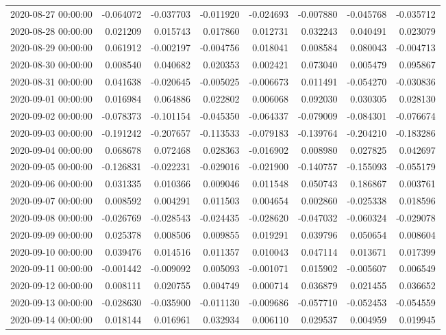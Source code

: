 \begin{tabular}{lrrrrrrr}
2020-08-27 00:00:00 & -0.064072 & -0.037703 & -0.011920 & -0.024693 & -0.007880 & -0.045768 & -0.035712 \\
2020-08-28 00:00:00 & 0.021209 & 0.015743 & 0.017860 & 0.012731 & 0.032243 & 0.040491 & 0.023079 \\
2020-08-29 00:00:00 & 0.061912 & -0.002197 & -0.004756 & 0.018041 & 0.008584 & 0.080043 & -0.004713 \\
2020-08-30 00:00:00 & 0.008540 & 0.040682 & 0.020353 & 0.002421 & 0.073040 & 0.005479 & 0.095867 \\
2020-08-31 00:00:00 & 0.041638 & -0.020645 & -0.005025 & -0.006673 & 0.011491 & -0.054270 & -0.030836 \\
2020-09-01 00:00:00 & 0.016984 & 0.064886 & 0.022802 & 0.006068 & 0.092030 & 0.030305 & 0.028130 \\
2020-09-02 00:00:00 & -0.078373 & -0.101154 & -0.045350 & -0.064337 & -0.079009 & -0.084301 & -0.076674 \\
2020-09-03 00:00:00 & -0.191242 & -0.207657 & -0.113533 & -0.079183 & -0.139764 & -0.204210 & -0.183286 \\
2020-09-04 00:00:00 & 0.068678 & 0.072468 & 0.028363 & -0.016902 & 0.008980 & 0.027825 & 0.042697 \\
2020-09-05 00:00:00 & -0.126831 & -0.022231 & -0.029016 & -0.021900 & -0.140757 & -0.155093 & -0.055179 \\
2020-09-06 00:00:00 & 0.031335 & 0.010366 & 0.009046 & 0.011548 & 0.050743 & 0.186867 & 0.003761 \\
2020-09-07 00:00:00 & 0.008592 & 0.004291 & 0.011503 & 0.004654 & 0.002860 & -0.025338 & 0.018596 \\
2020-09-08 00:00:00 & -0.026769 & -0.028543 & -0.024435 & -0.028620 & -0.047032 & -0.060324 & -0.029078 \\
2020-09-09 00:00:00 & 0.025378 & 0.008506 & 0.009855 & 0.019291 & 0.039796 & 0.050654 & 0.008604 \\
2020-09-10 00:00:00 & 0.039476 & 0.014516 & 0.011357 & 0.010043 & 0.047114 & 0.013671 & 0.017399 \\
2020-09-11 00:00:00 & -0.001442 & -0.009092 & 0.005093 & -0.001071 & 0.015902 & -0.005607 & 0.006549 \\
2020-09-12 00:00:00 & 0.008111 & 0.020755 & 0.004749 & 0.000714 & 0.036879 & 0.021455 & 0.036652 \\
2020-09-13 00:00:00 & -0.028630 & -0.035900 & -0.011130 & -0.009686 & -0.057710 & -0.052453 & -0.054559 \\
2020-09-14 00:00:00 & 0.018144 & 0.016961 & 0.032934 & 0.006110 & 0.029537 & 0.004959 & 0.019945 \\

\end{tabular}
